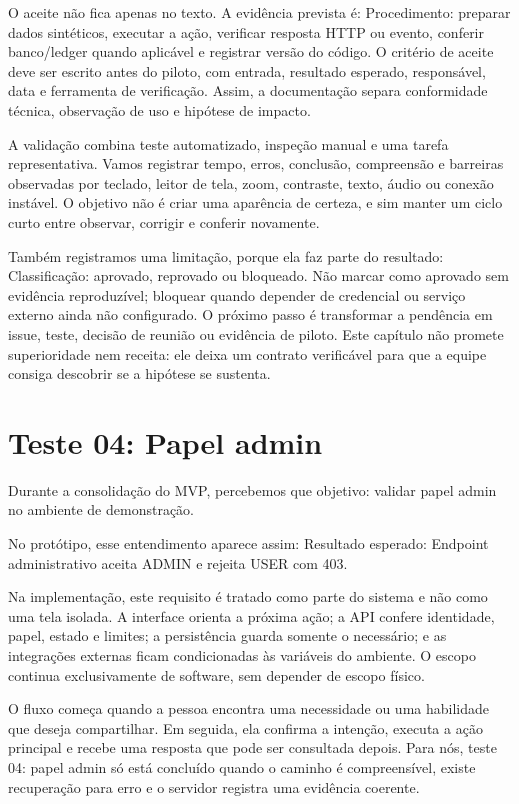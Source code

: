 \documentclass[12pt,oneside,a4paper,article]{abntex2}
\begin{document}
O aceite não fica apenas no texto. A evidência prevista é: Procedimento: preparar dados sintéticos, executar a ação, verificar resposta HTTP ou evento, conferir banco/ledger quando aplicável e registrar versão do código. O critério de aceite deve ser escrito antes do piloto, com entrada, resultado esperado, responsável, data e ferramenta de verificação. Assim, a documentação separa conformidade técnica, observação de uso e hipótese de impacto.

A validação combina teste automatizado, inspeção manual e uma tarefa representativa. Vamos registrar tempo, erros, conclusão, compreensão e barreiras observadas por teclado, leitor de tela, zoom, contraste, texto, áudio ou conexão instável. O objetivo não é criar uma aparência de certeza, e sim manter um ciclo curto entre observar, corrigir e conferir novamente.

Também registramos uma limitação, porque ela faz parte do resultado: Classificação: aprovado, reprovado ou bloqueado. Não marcar como aprovado sem evidência reproduzível; bloquear quando depender de credencial ou serviço externo ainda não configurado. O próximo passo é transformar a pendência em issue, teste, decisão de reunião ou evidência de piloto. Este capítulo não promete superioridade nem receita: ele deixa um contrato verificável para que a equipe consiga descobrir se a hipótese se sustenta.

\section{Teste 04: Papel admin}
Durante a consolidação do MVP, percebemos que objetivo: validar papel admin no ambiente de demonstração.

No protótipo, esse entendimento aparece assim: Resultado esperado: Endpoint administrativo aceita ADMIN e rejeita USER com 403.

Na implementação, este requisito é tratado como parte do sistema e não como uma tela isolada. A interface orienta a próxima ação; a API confere identidade, papel, estado e limites; a persistência guarda somente o necessário; e as integrações externas ficam condicionadas às variáveis do ambiente. O escopo continua exclusivamente de software, sem depender de escopo físico.

O fluxo começa quando a pessoa encontra uma necessidade ou uma habilidade que deseja compartilhar. Em seguida, ela confirma a intenção, executa a ação principal e recebe uma resposta que pode ser consultada depois. Para nós, teste 04: papel admin só está concluído quando o caminho é compreensível, existe recuperação para erro e o servidor registra uma evidência coerente.
\end{document}
